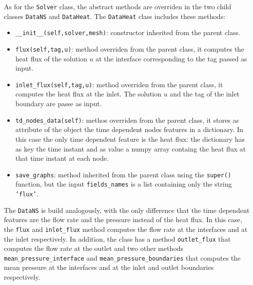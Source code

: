 \documentclass[11pt,a4paper]{article}
\begin{document}
As for the \texttt{Solver} class, the abstract methods are overriden in the two child classes \texttt{DataNS}
and \texttt{DataHeat}. The \texttt{DataHeat} class includes these methods:
\begin{itemize}
    \item \texttt{\_\_init\_\_(self,solver,mesh)}: constructor inherited from the parent class. 
    \item \texttt{flux(self,tag,u)}: method overriden from the parent class, it computes the heat flux of the solution \(u\) at the interface corresponding to the tag passed as input.
    \item \texttt{inlet\_flux(self,tag,u)}: method overriden from the parent class, it computes the heat flux at the inlet. The solution \(u\) and the tag of the inlet boundary are passe as input. 
    \item \texttt{td\_nodes\_data(self)}: methos overriden from the parent class, it stores as attribute of the object the time dependent nodes features in a dictionary. In this case the only time dependent feature is the heat flux: the dictionary has as key the time instant and as value a numpy array containg the heat flux at that time instant at each node.
    \item \texttt{save\_graphs}: method inherited from the parent class using the \texttt{super()} function, but the input \texttt{fields\_names} is a list containing only the string \texttt{'flux'}.
\end{itemize}

The \texttt{DataNS} is build analogously, with the only difference that the time dependent features are the flow rate and the pressure instead of the heat flux. In this case, the \texttt{flux} and \texttt{inlet\_flux} method computes the flow rate at the interfaces and at the inlet respectively. In addition, the class has a method \texttt{outlet\_flux} that computes the flow rate at the outlet and two other methods \texttt{mean\_pressure\_interface} and \texttt{mean\_pressure\_boundaries} that computes the mean pressure at the interfaces and at the inlet and outlet boundaries respectively.
\end{document}
